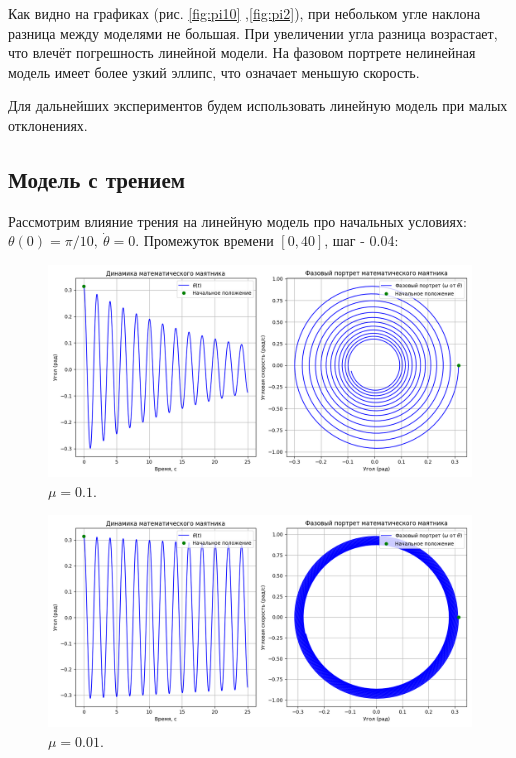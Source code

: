 Как видно на графиках (рис. \ref{fig:pi10} ,\ref{fig:pi2}), при небольком угле наклона разница между моделями не большая. При увеличении угла разница возрастает, что влечёт погрешность линейной модели. На фазовом портрете нелинейная модель имеет более узкий эллипс, что означает меньшую скорость. 

Для дальнейших экспериментов будем использовать линейную модель при малых отклонениях.

\newpage
\subsection*{Модель с трением}
Рассмотрим влияние трения на линейную модель про начальных условиях: $\theta(0) = \pi /10, \ \dot{\theta} = 0$. Промежуток времени $[0,40]$, шаг - 0.04:
\begin{figure}[h]  %
	\centering
	\includegraphics[width=1\textwidth]{imgs/lin_mu01.png}  %
	\caption{$\mu = 0.1$.}  %
	\label{fig:mu_01}  %
\end{figure}

\begin{figure}[h]  %
	\centering
	\includegraphics[width=1\textwidth]{imgs/lin_mu001.png}  %
	\caption{$\mu = 0.01$.}  %
	\label{fig:mu_001}  %
\end{figure}

